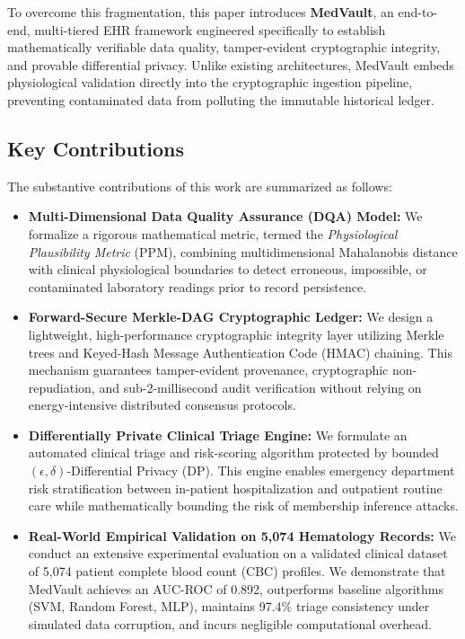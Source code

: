 \documentclass[conference]{IEEEtran}
\begin{document}
To overcome this fragmentation, this paper introduces \textbf{MedVault}, an end-to-end, multi-tiered EHR framework engineered specifically to establish mathematically verifiable data quality, tamper-evident cryptographic integrity, and provable differential privacy. Unlike existing architectures, MedVault embeds physiological validation directly into the cryptographic ingestion pipeline, preventing contaminated data from polluting the immutable historical ledger.

\subsection{Key Contributions}
The substantive contributions of this work are summarized as follows:
\begin{itemize}
    \item \textbf{Multi-Dimensional Data Quality Assurance (DQA) Model:} We formalize a rigorous mathematical metric, termed the \textit{Physiological Plausibility Metric} (PPM), combining multidimensional Mahalanobis distance with clinical physiological boundaries to detect erroneous, impossible, or contaminated laboratory readings prior to record persistence.
    \item \textbf{Forward-Secure Merkle-DAG Cryptographic Ledger:} We design a lightweight, high-performance cryptographic integrity layer utilizing Merkle trees and Keyed-Hash Message Authentication Code (HMAC) chaining. This mechanism guarantees tamper-evident provenance, cryptographic non-repudiation, and sub-2-millisecond audit verification without relying on energy-intensive distributed consensus protocols.
    \item \textbf{Differentially Private Clinical Triage Engine:} We formulate an automated clinical triage and risk-scoring algorithm protected by bounded $(\epsilon, \delta)$-Differential Privacy (DP). This engine enables emergency department risk stratification between in-patient hospitalization and outpatient routine care while mathematically bounding the risk of membership inference attacks.
    \item \textbf{Real-World Empirical Validation on 5,074 Hematology Records:} We conduct an extensive experimental evaluation on a validated clinical dataset of 5,074 patient complete blood count (CBC) profiles. We demonstrate that MedVault achieves an AUC-ROC of 0.892, outperforms baseline algorithms (SVM, Random Forest, MLP), maintains 97.4\% triage consistency under simulated data corruption, and incurs negligible computational overhead.
\end{itemize}
\end{document}

